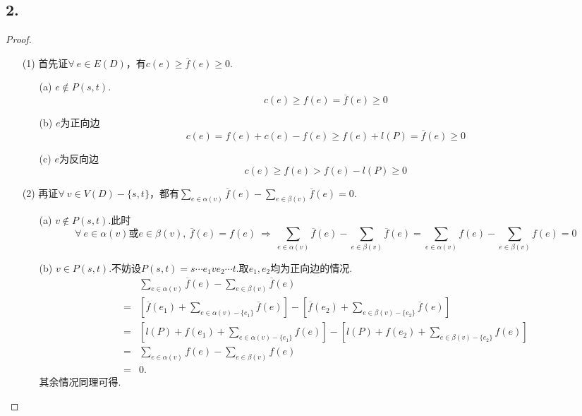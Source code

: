 \documentclass{article}
\begin{document}
\subsection*{2.}
\begin{proof}
    \begin{enumerate}
        \item []
        \item [(1)]首先证$\forall\ e\in E(D)$，有$c(e) \geq \overline{f} (e) \geq 0$.
        \begin{enumerate}
            \item [(a)]$e\notin P(s,t)$.
            \[
                c(e)\geq f(e) = \overline{f}(e) \geq 0
            \]
            \item [(b)]$e$为正向边
            \[
                c(e)=f(e) + c(e) - f(e)
                \geq f(e) + l(P)
                = \overline{f} (e)
                \geq 0
            \]
            \item [(c)]$e$为反向边
            \[
                c(e)\geq f(e)
                > f(e) - l(P)
                \geq 0
            \]
        \end{enumerate}
        \item [(2)]再证$\forall\ v\in V(D)-\{s,t\}$，都有$\sum\limits_{e\in \alpha(v)} \overline{f} (e) - \sum\limits_{e\in \beta(v)} \overline{f}(e)=0$.
        \begin{enumerate}
            \item [(a)]$v\notin P(s,t)$.此时
            \[
                \forall\ e\in \alpha(v)\mbox{或} e\in \beta(v),\ 
                \overline{f}(e) = f(e)\ 
                \Rightarrow\ 
                \sum\limits_{e\in \alpha(v)} \overline{f}(e) - \sum\limits_{e\in \beta(v)}\overline{f}(e)=
                \sum\limits_{e\in \alpha(v)} f(e) - \sum\limits_{e\in \beta(v)}f(e)=0
            \]
            \item [(b)]$v\in P(s,t)$.不妨设$P(s,t)=s\cdots e_1 v e_2 \cdots t$.取$e_1, e_2$均为正向边的情况.
            \begin{align*}
                &\sum\limits_{e\in\alpha (v)} \overline{f}(e) - \sum\limits_{e\in \beta (v)} \overline{f}(e) \\
                =&\left[\overline{f}(e_1) + \sum\limits_{e\in\alpha (v)- \{e_1\} } \overline{f}(e) \right]
                - \left[\overline{f}(e_2) + \sum\limits_{e\in\beta (v)- \{e_2\} } \overline{f}(e) \right]\\
                =&\left[l(P) + f(e_1) + \sum\limits_{e\in\alpha (v)- \{e_1\} } f(e) \right]
                - \left[l(P) + f(e_2) + \sum\limits_{e\in\beta (v)- \{e_2\} } f(e) \right]\\
                =&\sum\limits_{e\in \alpha(v)} f(e) - \sum\limits_{e\in \beta(v)}f(e)\\
                =&0.
            \end{align*}
            其余情况同理可得.
        \end{enumerate}
    \end{enumerate}
\end{proof}
\end{document}
